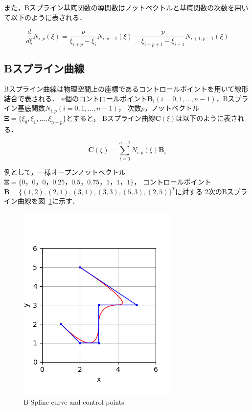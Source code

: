 \newpage

また，Bスプライン基底関数の導関数はノットベクトルと基底関数の次数を用いて以下のように表される．

\begin{equation}
  \label{eq:d of B-spline shape func}
  \frac{d}{d\xi}N_{i,p}(\xi) = \frac{p}{\xi_{i+p} - \xi_i}N_{i,p-1}(\xi) - \frac{p}{\xi_{i+p+1} - \xi_{i+1}}N_{i+1,p-1}(\xi)
\end{equation}

\subsection{Bスプライン曲線}
Bスプライン曲線は物理空間上の座標であるコントロールポイントを用いて線形結合で表される．
$n$個のコントロールポイント$\boldsymbol{B}_i(i = 0, 1, \dots, n-1)$，Bスプライン基底関数$N_{i, p}(i = 0, 1, \dots, n-1)$，
次数$p$，ノットベクトル$\boldsymbol{\Xi} = \{\xi_0, \xi_1, \dots, \xi_{n+p}\}$とすると，
Bスプライン曲線$\boldsymbol{C}(\xi)$は以下のように表される．

\begin{equation}
  \boldsymbol{C}(\xi)=\sum_{i=0}^{n-1} N_{i,p}(\xi)\boldsymbol{B}_i
\end{equation}

例として，一様オープンノットベクトル$\boldsymbol{\Xi}=\{0，0，0，0.25，0.5，0.75，1，1，1\}$，
コントロールポイント$\boldsymbol{B} = \{(1,2),(2,1),(3,1),(3,3),(5,3),(2,5)\}^T$に対する
2次のBスプライン曲線を図~\ref{fig:b-spline curve}に示す．

\begin{figure}[htbp]
  \centering
  \includegraphics[keepaspectratio, scale = 1.0]
  {fig/png/03.png}
  \caption{B-Spline curve and control points}
  \label{fig:b-spline curve}
\end{figure}

